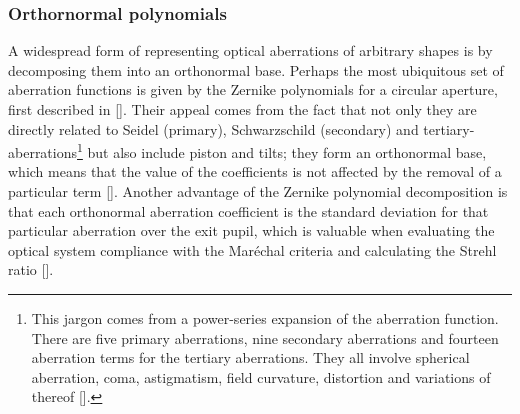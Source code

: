 \begin{refsection}
\subsubsection*{Orthornormal polynomials}

A widespread form of representing optical aberrations of arbitrary shapes is by decomposing them into an orthonormal base. Perhaps the most ubiquitous set of aberration functions is given by the Zernike polynomials for a circular aperture, first described in [\cite{Zernike1934}]. Their appeal comes from the fact that not only they are directly related to Seidel (primary), Schwarzschild (secondary) and tertiary-aberrations\footnote{This jargon comes from a power-series expansion of the aberration function. There are five primary aberrations, nine secondary aberrations and fourteen aberration terms for the tertiary aberrations. They all involve spherical aberration, coma, astigmatism, field
curvature, distortion and variations of thereof [\cite{Mahajan2013}].} but also include piston and tilts; they form an orthonormal base, which means that the value of the coefficients is not affected by the removal of a particular term [\cite{Mahajan2007}]. Another advantage of the Zernike polynomial decomposition is that each orthonormal aberration coefficient is the standard deviation for that particular aberration over the exit pupil, which is valuable when evaluating the optical system compliance with the  Mar\'echal criteria and calculating the Strehl ratio [\cite{Mahajan1983}].


\end{refsection}
